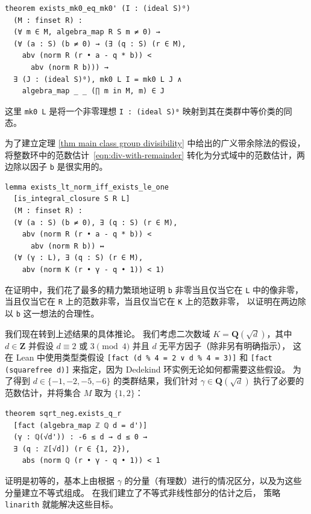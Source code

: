 \documentclass[sigplan,10pt,nonacm,
screen]{acmart} \settopmatter{printfolios=true,printccs=false,printacmref=false}
\newcommand{\QQ}{\mathbf{Q}}
\newcommand{\ZZ}{\mathbf{Z}}
\begin{document}
\begin{lstlisting}
theorem exists_mk0_eq_mk0' (I : (ideal S)⁰)
  (M : finset R) :
  (∀ m ∈ M, algebra_map R S m ≠ 0) →
  (∀ (a : S) (b ≠ 0) → (∃ (q : S) (r ∈ M),
    abv (norm R (r • a - q * b)) <
      abv (norm R b))) →
  ∃ (J : (ideal S)⁰), mk0 L I = mk0 L J ∧
    algebra_map _ _ (∏ m in M, m) ∈ J
\end{lstlisting}
这里 \lstinline{mk0 L} 是将一个非零理想 \lstinline{I : (ideal S)⁰} 映射到其在类群中等价类的同态。

为了建立定理 \ref{thm main class group divisibility} 中给出的广义带余除法的假设，
将整数环中的范数估计~\eqref{eqn:div-with-remainder} 转化为分式域中的范数估计，两边除以因子 \lstinline{b} 是很实用的。
\begin{lstlisting}
lemma exists_lt_norm_iff_exists_le_one
  [is_integral_closure S R L]
  (M : finset R) :
  (∀ (a : S) (b ≠ 0), ∃ (q : S) (r ∈ M),
    abv (norm R (r • a - q * b)) <
      abv (norm R b)) ↔
  (∀ (γ : L), ∃ (q : S) (r ∈ M),
    abv (norm K (r • γ - q • 1)) < 1)
\end{lstlisting}
在证明中，我们花了最多的精力繁琐地证明 \lstinline{b} 非零当且仅当它在 \lstinline{L} 中的像非零，当且仅当它在 \lstinline{R} 上的范数非零，当且仅当它在 \lstinline{K} 上的范数非零，
以证明在两边除以 \lstinline{b} 这一想法的合理性。

我们现在转到上述结果的具体推论。
我们考虑二次数域 $K=\QQ(\sqrt{d})$，其中 $d \in \ZZ$ 并假设 $d\equiv 2 \text{ 或 } 3 \pmod{4}$ 并且 $d$ 无平方因子（除非另有明确指示），
这在 Lean 中使用类型类假设 \lstinline{[fact (d % 4 = 2 ∨ d % 4 = 3)]} 和 \lstinline{[fact} \lstinline{(square}\-\lstinline{free d)]} 来指定，因为 Dedekind 环实例无论如何都需要这些假设。
为了得到 $d \in \{-1,-2,-5,-6 \}$ 的类群结果，我们针对 $\gamma \in \QQ(\sqrt{d})$ 执行了必要的范数估计，并将集合 $M$ 取为 $\{1,2\}$：

\begin{lstlisting}
theorem sqrt_neg.exists_q_r
  [fact (algebra_map ℤ ℚ d = d')]
  (γ : ℚ(√d')) : -6 ≤ d → d ≤ 0 →
  ∃ (q : ℤ[√d]) (r ∈ {1, 2}),
    abs (norm ℚ (r • γ - q • 1)) < 1
\end{lstlisting}

证明是初等的，基本上由根据 $\gamma$ 的分量（有理数）进行的情况区分，以及为这些分量建立不等式组成。
在我们建立了不等式非线性部分的估计之后，
策略 \lstinline{linarith} 就能解决这些目标。
\end{document}
